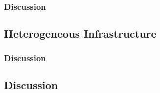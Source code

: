 \subsubsection{Discussion}

\subsection{Heterogeneous Infrastructure}

\subsubsection{Discussion}


\subsection{Discussion}